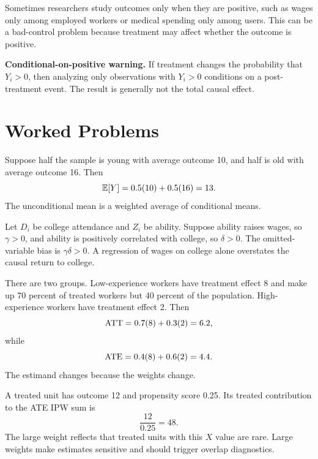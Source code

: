 Sometimes researchers study outcomes only when they are positive, such as wages
only among employed workers or medical spending only among users. This can be a
bad-control problem because treatment may affect whether the outcome is
positive.

\begin{boxF}
\textbf{Conditional-on-positive warning.} If treatment changes the probability
that \(Y_i>0\), then analyzing only observations with \(Y_i>0\) conditions on a
post-treatment event. The result is generally not the total causal effect.
\end{boxF}

\section{Worked Problems}

\begin{exmp}
Suppose half the sample is young with average outcome 10, and half is old with
average outcome 16. Then
\[
    \mathbb{E}[Y]=0.5(10)+0.5(16)=13.
\]
The unconditional mean is a weighted average of conditional means.
\end{exmp}

\begin{exmp}
Let \(D_i\) be college attendance and \(Z_i\) be ability. Suppose ability raises
wages, so \(\gamma>0\), and ability is positively correlated with college, so
\(\delta>0\). The omitted-variable bias is \(\gamma\delta>0\). A regression of
wages on college alone overstates the causal return to college.
\end{exmp}

\begin{exmp}
There are two groups. Low-experience workers have treatment effect 8 and make up
70 percent of treated workers but 40 percent of the population. High-experience
workers have treatment effect 2. Then
\[
    \mathrm{ATT}=0.7(8)+0.3(2)=6.2,
\]
while
\[
    \mathrm{ATE}=0.4(8)+0.6(2)=4.4.
\]
The estimand changes because the weights change.
\end{exmp}

\begin{exmp}
A treated unit has outcome 12 and propensity score 0.25. Its treated contribution
to the ATE IPW sum is
\[
    \frac{12}{0.25}=48.
\]
The large weight reflects that treated units with this \(X\) value are rare.
Large weights make estimates sensitive and should trigger overlap diagnostics.
\end{exmp}


